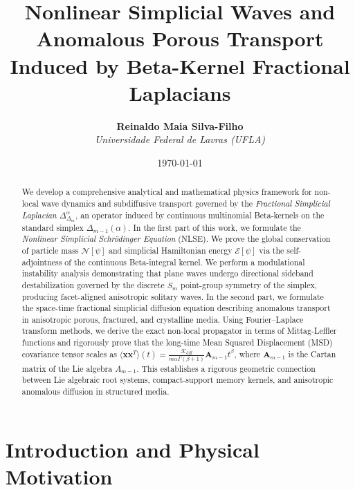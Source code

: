 \documentclass[11pt,a4paper]{article}
\title{\textbf{Nonlinear Simplicial Waves and Anomalous Porous Transport Induced by Beta-Kernel Fractional Laplacians}}
\author{\textbf{Reinaldo Maia Silva-Filho} \\ \textit{Universidade Federal de Lavras (UFLA)}}
\date{\today}
\theoremstyle{plain}
\theoremstyle{definition}
\theoremstyle{remark}
\numberwithin{equation}{section}
\begin{document}
\maketitle

\begin{abstract}
We develop a comprehensive analytical and mathematical physics framework for non-local wave dynamics and subdiffusive transport governed by the \emph{Fractional Simplicial Laplacian} $\Delta_{\Delta_m}^\alpha$, an operator induced by continuous multinomial Beta-kernels on the standard simplex $\Delta_{m-1}(\alpha)$. In the first part of this work, we formulate the \emph{Nonlinear Simplicial Schr\"odinger Equation} (NLSE). We prove the global conservation of particle mass $\mathcal{N}[\psi]$ and simplicial Hamiltonian energy $\mathcal{E}[\psi]$ via the self-adjointness of the continuous Beta-integral kernel. We perform a modulational instability analysis demonstrating that plane waves undergo directional sideband destabilization governed by the discrete $S_m$ point-group symmetry of the simplex, producing facet-aligned anisotropic solitary waves. In the second part, we formulate the space-time fractional simplicial diffusion equation describing anomalous transport in anisotropic porous, fractured, and crystalline media. Using Fourier--Laplace transform methods, we derive the exact non-local propagator in terms of Mittag-Leffler functions and rigorously prove that the long-time Mean Squared Displacement (MSD) covariance tensor scales as $\langle \mathbf{x}\mathbf{x}^T \rangle(t) = \frac{\mathcal{K}_{\text{diff}}}{m \alpha \Gamma(\beta+1)} \mathbf{A}_{m-1} t^\beta$, where $\mathbf{A}_{m-1}$ is the Cartan matrix of the Lie algebra $A_{m-1}$. This establishes a rigorous geometric connection between Lie algebraic root systems, compact-support memory kernels, and anisotropic anomalous diffusion in structured media.
\end{abstract}

\tableofcontents
\newpage

\section{Introduction and Physical Motivation}
\end{document}
